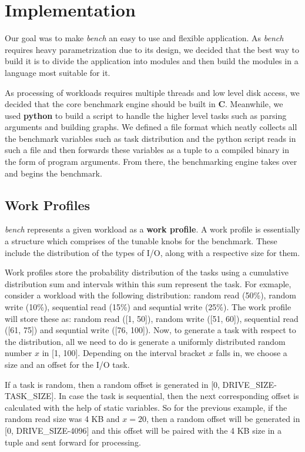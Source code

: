 \documentclass[10pt, author, twocolumn]{article}
\begin{document}
\section{Implementation}
Our goal was to make \textit{bench} an easy to use and flexible application. As \textit{bench} requires heavy parametrization due to its design, we decided that the best way to build it is to divide the application into modules and then build the modules in a language most suitable for it.

As processing of workloads requires multiple threads and low level disk access, we decided that the core benchmark engine should be built in \textbf{C}. Meanwhile, we used \textbf{python} to build a script to handle the higher level tasks such as parsing arguments and building graphs. We defined a file format which neatly collects all the benchmark variables such as task distribution and the python script reads in such a file and then forwards these variables as a tuple to a compiled binary in the form of program arguments. From there, the benchmarking engine takes over and begins the benchmark. 

\subsection{Work Profiles}
\textit{bench} represents a given workload as a \textbf{work profile}. A work profile is essentially a structure which comprises of the tunable knobs for the benchmark. These include the distribution of the types of I/O, along with a respective size for them. 

Work profiles store the probability distribution of the tasks using a cumulative distribution sum and intervals within this sum represent the task. For exmaple, consider a workload with the following distribution: random read (50\%), random write (10\%), sequential read (15\%) and sequntial write (25\%). The work profile will store these as: random read ([1, 50]), random write ([51, 60]), sequential read ([61, 75]) and sequntial write ([76, 100]). Now, to generate a task with respect to the distribution, all we need to do is generate a uniformly distributed random number $x$ in [1, 100]. Depending on the interval bracket $x$ falls in, we choose a size and an offset for the I/O task. 

If a task is random, then a random offset is generated in [0, DRIVE\_SIZE-TASK\_SIZE]. In case the task is sequential, then the next corresponding offset is calculated with the help of static variables. So for the previous example, if the random read size was 4 KB and $x = 20$, then a random offset will be generated in [0, DRIVE\_SIZE-4096] and this offset will be paired with the 4 KB size in a tuple and sent forward for processing.
\end{document}
